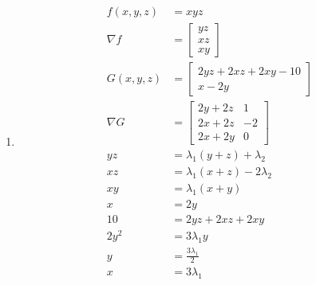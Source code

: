 \documentclass[11pt,letterpaper]{article}
\begin{document}
\begin{enumerate}
\begin{align*}
            -
            \begin{bmatrix}
              a \\ 0 \\ Aa^2
            \end{bmatrix}
            \right) &= \begin{bmatrix} 0 \end{bmatrix} \\
    P_3 :\ \begin{bmatrix}
              0 & 2Bb & -1
            \end{bmatrix}
            \left(
            \begin{bmatrix}
              x \\ y \\ z
            \end{bmatrix}
            -
            \begin{bmatrix}
              0 \\ b \\ Bb^2
            \end{bmatrix}
            \right) &= \begin{bmatrix} 0 \end{bmatrix}
  \end{align*}

\item
  \begin{align*}
    f(x,y,z) &= xyz \\
    \nabla f &= \begin{bmatrix} yz \\ xz \\ xy \end{bmatrix} \\
    G(x,y,z) &= \begin{bmatrix}
                  2yz+2xz+2xy-10 \\
                  x-2y
                \end{bmatrix} \\
    \nabla G &= \begin{bmatrix}
                  2y+2z & 1 \\
                  2x+2z & -2 \\
                  2x+2y & 0
                \end{bmatrix} \\
  yz &= \lambda_1(y+z)+\lambda_2 \\
  xz &= \lambda_1(x+z)-2\lambda_2 \\
  xy &= \lambda_1(x+y) \\
  x &= 2y \\
  10 &= 2yz+2xz+2xy \\
  2y^2 &= 3\lambda_1 y \\
  y &= \frac{3\lambda_1}{2} \\
  x &= 3\lambda_1
  \end{align*}
\end{enumerate}
\end{document}
